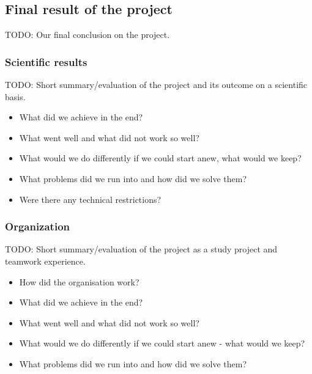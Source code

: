 \subsection{Final result of the project}

TODO: Our final conclusion on the project.


\subsubsection{Scientific results}

TODO: Short summary/evaluation of the project and its outcome on a scientific basis.

\begin{itemize}
\item What did we achieve in the end?
\item What went well and what did not work so well?
\item What would we do differently if we could start anew, what would we keep?
\item What problems did we run into and how did we solve them?
\item Were there any technical restrictions?
\end{itemize}


\subsubsection{Organization}

TODO: Short summary/evaluation of the project as a study project and teamwork experience.

\begin{itemize}
\item How did the organisation work?
\item What did we achieve in the end?
\item What went well and what did not work so well?
\item What would we do differently if we could start anew - what would we keep?
\item What problems did we run into and how did we solve them?
\end{itemize}

